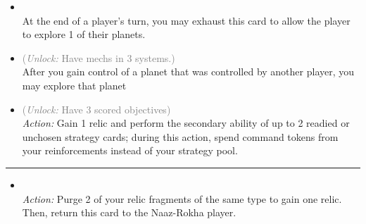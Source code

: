\begin{multicols}{2}
\begin{itemize}
\item {}\\
At the end of a player's turn, you may exhaust this card to allow the player to explore 1 of their planets.
\item {} \textcolor{gray}{(\emph{Unlock:} Have mechs in 3 systems.)}\\
After you gain control of a planet that was controlled by another player, you may explore that planet
\item {} \textcolor{gray}{(\emph{Unlock:} Have 3 scored objectives)}\\
\emph{Action:} Gain 1 relic and perform the secondary ability of up to 2 readied or unchosen strategy cards; during this action, spend command tokens from your reinforcements instead of your strategy pool. 
\end{itemize}

\vspace{-10pt}\rule{\hsize}{0.4pt}\vspace{5pt}


\begin{itemize}
\item {}\\
\emph{Action:} Purge 2 of your relic fragments of the same type to gain one relic. Then, return this card to the Naaz-Rokha player.
\end{itemize}

\end{multicols}




